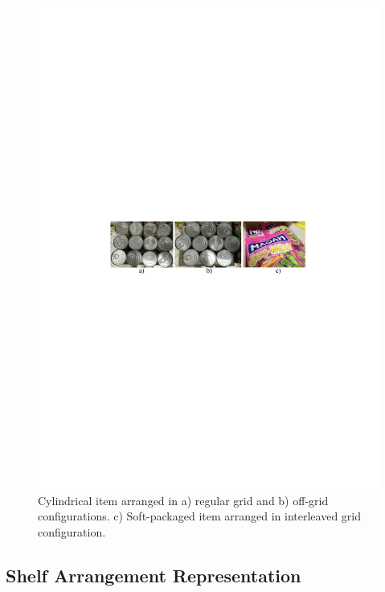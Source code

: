 \begin{figure}[h]
	\centering
	\includegraphics[width=0.8\linewidth]{figures/complex-config}
	\caption{Cylindrical item arranged in a) regular grid and b) off-grid configurations. c) Soft-packaged item arranged in interleaved grid configuration.}
	\label{fig:off-grid}
\end{figure}





\subsection{Shelf Arrangement Representation}
\label{sec:irosrepresentation}

